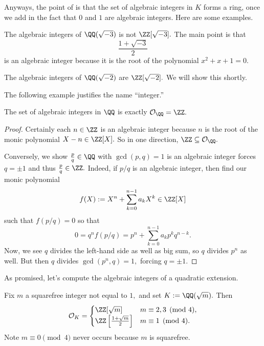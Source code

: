 Anyways, the point of is that the set of algebraic integers in $K$ forms a ring, once we add in the fact that $0$ and $1$ are algebraic integers. Here are some examples.
\begin{ex}
	The algebraic integers of $\QQ(\sqrt{-3})$ is not $\ZZ[\sqrt{-3}].$ The main point is that
	\[\frac{1+\sqrt{-3}}2\]
	is an algebraic integer because it is the root of the polynomial $x^2+x+1=0.$ 
\end{ex}
\begin{example}
	The algebraic integers of $\QQ(\sqrt{-2})$ are $\ZZ[\sqrt{-2}].$ We will show this shortly.
\end{example}
The following example justifies the name ``integer.''
\begin{exe}
	The set of algebraic integers in $\QQ$ is exactly $\mathcal O_\QQ=\ZZ.$
\end{exe}
\begin{proof}
	Certainly each $n\in\ZZ$ is an algebraic integer because $n$ is the root of the monic polynomial $X-n\in\ZZ[X].$ So in one direction, $\ZZ\subseteq\mathcal O_\QQ.$
	
	Conversely, we show $\frac pq\in\QQ$ with $\gcd(p,q)=1$ is an algebraic integer forces $q=\pm1$ and thus $\frac pq\in\ZZ.$ Indeed, if $p/q$ is an algebraic integer, then find our monic polynomial
	\[f(X):=X^n+\sum_{k=0}^{n-1}a_kX^k\in\ZZ[X]\]
	such that $f(p/q)=0$ so that
	\[0=q^nf(p/q)=p^n+\sum_{k=0}^{n-1}a_kp^kq^{n-k}.\]
	Now, we see $q$ divides the left-hand side as well as big sum, so $q$ divides $p^n$ as well. But then $q$ divides $\gcd\left(p^n,q\right)=1,$ forcing $q=\pm1.$
\end{proof}
As promised, let's compute the algebraic integers of a quadratic extension.
\begin{exe}
	Fix $m$ a squarefree integer not equal to $1,$ and set $K:=\QQ(\sqrt m).$ Then
	\[\mathcal O_K=\begin{cases}
		\ZZ[\sqrt m] & m\equiv2,3\pmod4, \\
		\ZZ\left[\frac{1+\sqrt m}2\right] & m\equiv1\pmod4.
	\end{cases}\]
	Note $m\equiv0\pmod4$ never occurs because $m$ is squarefree.
\end{exe}
